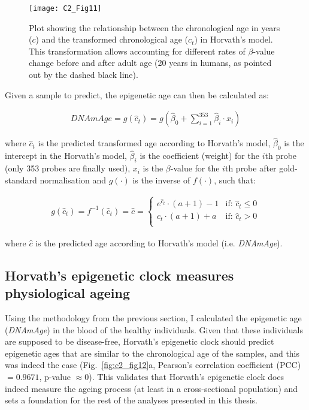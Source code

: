 \begin{enumerate}
	\begin{figure}[htbp!] 
		\centering
		\texttt{[image: C2\_Fig11]}
		\vspace*{2mm}    
		\caption[Transforming chronological age in Horvath's model]{Plot showing the relationship between the chronological age in years ($c$) and the transformed chronological age ($c_t$) in Horvath's model. This transformation allows accounting for different rates of $\beta$-value change before and after adult age (20 years in humans, as pointed out by the dashed black line).}
		\label{fig:c2_fig11}
	\end{figure} 
	
	Given a sample to predict, the epigenetic age can then be calculated as:
	
	\begin{align}
	DNAmAge = g(\hat{c}_t) = g(\hat{\beta}_0 + \sum_{i=1}^{353}\hat{\beta}_i \cdot x_i)
	\end{align}
	
	where $\hat{c}_t$ is the predicted transformed age according to Horvath's model, $\hat{\beta}_0$ is the intercept in the Horvath's model, $\hat{\beta}_i$ is the coefficient (weight) for the $i$th probe (only 353 probes are finally used), $x_i$ is the $\beta$-value for the $i$th probe after gold-standard normalisation and $g(\cdot)$ is the inverse of $f(\cdot)$, such that:
	
	\begin{align}
	g(\hat{c}_t) = f^{-1}(\hat{c}_t) = \hat{c} = 
	\begin{cases}
	e^{\hat{c}_t} \cdot (a+1) - 1 &\text{if: } \hat{c}_t \leq 0 \\
	\hat{c}_t \cdot (a+1) + a &\text{if: } \hat{c}_t > 0 \\
	\end{cases}
	\end{align} 
	
	where $\hat{c}$ is the predicted age according to Horvath's model (i.e. \textit{DNAmAge}).
	
\end{enumerate}


\smallskip


\subsection{Horvath's epigenetic clock measures physiological ageing} \label{s:2.2.2}

\smallskip

Using the methodology from the previous section, I calculated the epigenetic age (\textit{\acrshort{DNAmAge}}) in the blood of the healthy individuals. Given that these individuals are supposed to be disease-free, Horvath's epigenetic clock should predict epigenetic ages that are similar to the chronological age of the samples, and this was indeed the case (Fig.~\ref{fig:c2_fig12}a, Pearson's correlation coefficient (\acrshort{PCC}) $= 0.9671$, p-value $\approx 0$). This validates that Horvath's epigenetic clock does indeed measure the ageing process (at least in a cross-sectional population) and sets a foundation for the rest of the analyses presented in this thesis.

